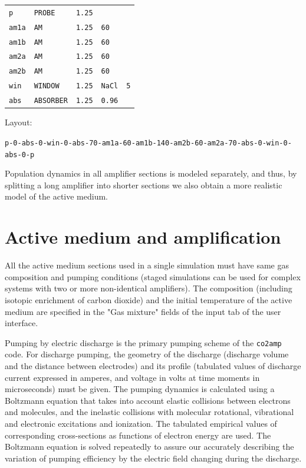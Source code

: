 \documentclass{report}
\begin{document}
\bigskip
\begin{tabular}{lllll}
\texttt{p}   & \texttt{PROBE}    & \texttt{1.25} &               &           \\
\texttt{am1a} & \texttt{AM}      & \texttt{1.25} & \texttt{60}  &           \\
\texttt{am1b} & \texttt{AM}      & \texttt{1.25} & \texttt{60}  &           \\
\texttt{am2a} & \texttt{AM}      & \texttt{1.25} & \texttt{60}  &           \\
\texttt{am2b} & \texttt{AM}      & \texttt{1.25} & \texttt{60}  &           \\
\texttt{win} & \texttt{WINDOW}   & \texttt{1.25} & \texttt{NaCl} & \texttt{5}\\
\texttt{abs} & \texttt{ABSORBER} & \texttt{1.25} & \texttt{0.96} &
\end{tabular}
\bigskip

Layout:\nopagebreak

\bigskip
\texttt{p-0-abs-0-win-0-abs-70-am1a-60-am1b-140-am2b-60-am2a-70-abs-0-win-0-abs-0-p}
\bigskip

Population dynamics in all amplifier sections is modeled separately, and thus, by splitting a long amplifier into shorter sections we also obtain a more realistic model of the active medium.


\section{Active medium and amplification}
All the active medium sections used in a single simulation must have same gas composition and pumping conditions (staged simulations can be used for complex systems with two or more non-identical amplifiers). The composition (including isotopic enrichment of carbon dioxide) and the initial temperature of the active medium are specified in the "Gas mixture" fields of the input tab of the user interface.

Pumping by electric discharge is the primary pumping scheme of the \texttt{co2amp} code. For discharge pumping, the geometry of the discharge (discharge volume and the distance between electrodes) and its profile (tabulated values of discharge current expressed in amperes, and voltage in volts at time moments in microseconds) must be given. The pumping dynamics is calculated using a Boltzmann equation that takes into account elastic collisions between electrons and molecules, and the inelastic collisions with molecular rotational, vibrational and electronic excitations and ionization. The tabulated empirical values of corresponding cross-sections as functions of electron energy are used. The Boltzmann equation is solved repeatedly to assure our accurately describing  the variation of pumping efficiency by the electric field changing during the discharge.
\end{document}
